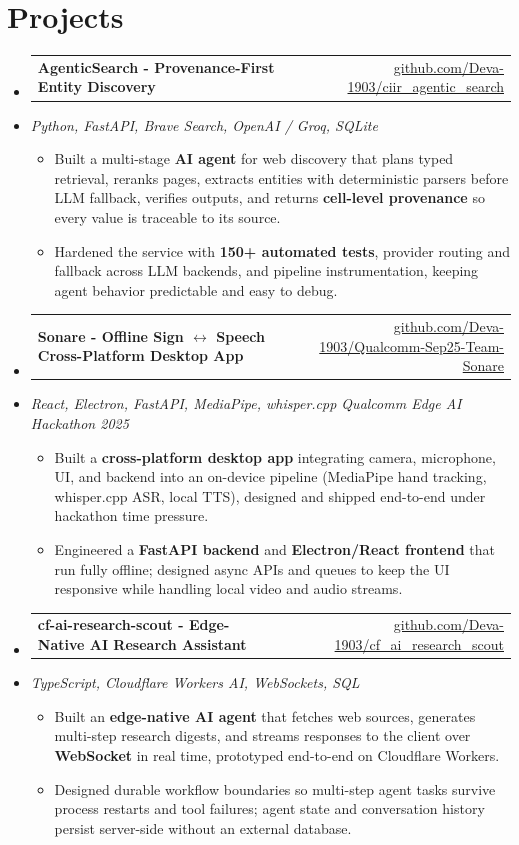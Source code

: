 \documentclass[letterpaper,10pt]{article}
\makeatletter
\newcommand{\resumeItem}[1]{
  \item\small{#1\vspace{-1pt}}
}
\newcommand{\resumeProjectHeading}[2]{
    \item
    \begin{tabular*}{0.985\textwidth}[t]{l@{\extracolsep{\fill}}r}
      \small\textbf{#1} & \small #2 \\
    \end{tabular*}\vspace{-5pt}
}
\newcommand{\resumeProjectSubheading}[1]{
  \vspace{-2pt}\item[] {\small\textcolor{ResumeSlate}{\emph{#1}}}\vspace{-3pt}
}
\newcommand{\resumeSubHeadingListStart}{\begin{itemize}[leftmargin=0.0in, label={}, itemsep=2pt, topsep=2pt]}
\newcommand{\resumeSubHeadingListEnd}{\end{itemize}}
\newcommand{\resumeItemListStart}{\begin{itemize}[leftmargin=0.18in, itemsep=2pt, topsep=1pt]}
\newcommand{\resumeItemListEnd}{\end{itemize}\vspace{-4pt}}
\makeatother
\begin{document}
\section{Projects}
\resumeSubHeadingListStart
  \resumeProjectHeading
    {AgenticSearch - Provenance-First Entity Discovery}
    {\href{https://github.com/Deva-1903/ciir_agentic_search}{github.com/Deva-1903/ciir\_agentic\_search}}
  \resumeProjectSubheading{Python, FastAPI, Brave Search, OpenAI / Groq, SQLite}
    \resumeItemListStart
      \resumeItem{Built a multi-stage \textbf{AI agent} for web discovery that plans typed retrieval, reranks pages, extracts entities with deterministic parsers before LLM fallback, verifies outputs, and returns \textbf{cell-level provenance} so every value is traceable to its source.}
      \resumeItem{Hardened the service with \textbf{150+ automated tests}, provider routing and fallback across LLM backends, and pipeline instrumentation, keeping agent behavior predictable and easy to debug.}
    \resumeItemListEnd
  \resumeProjectHeading
    {Sonare - Offline Sign \(\leftrightarrow\) Speech Cross-Platform Desktop App}
    {\href{https://github.com/Deva-1903/Qualcomm-Sep25-Team-Sonare}{github.com/Deva-1903/Qualcomm-Sep25-Team-Sonare}}
  \resumeProjectSubheading{React, Electron, FastAPI, MediaPipe, whisper.cpp \enspace\textbar\enspace Qualcomm Edge AI Hackathon 2025}
    \resumeItemListStart
      \resumeItem{Built a \textbf{cross-platform desktop app} integrating camera, microphone, UI, and backend into an on-device pipeline (MediaPipe hand tracking, whisper.cpp ASR, local TTS), designed and shipped end-to-end under hackathon time pressure.}
      \resumeItem{Engineered a \textbf{FastAPI backend} and \textbf{Electron/React frontend} that run fully offline; designed async APIs and queues to keep the UI responsive while handling local video and audio streams.}
    \resumeItemListEnd
  \resumeProjectHeading
    {cf-ai-research-scout - Edge-Native AI Research Assistant}
    {\href{https://github.com/Deva-1903/cf_ai_research_scout}{github.com/Deva-1903/cf\_ai\_research\_scout}}
  \resumeProjectSubheading{TypeScript, Cloudflare Workers AI, WebSockets, SQL}
    \resumeItemListStart
      \resumeItem{Built an \textbf{edge-native AI agent} that fetches web sources, generates multi-step research digests, and streams responses to the client over \textbf{WebSocket} in real time, prototyped end-to-end on Cloudflare Workers.}
      \resumeItem{Designed durable workflow boundaries so multi-step agent tasks survive process restarts and tool failures; agent state and conversation history persist server-side without an external database.}
    \resumeItemListEnd
\resumeSubHeadingListEnd
\vspace{-4pt}
\end{document}
